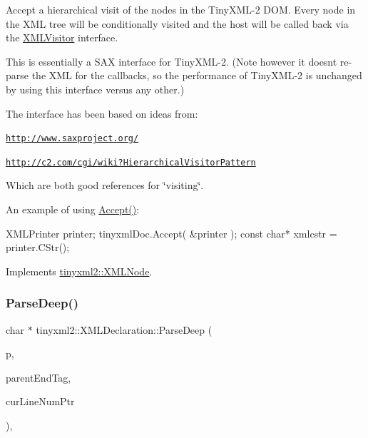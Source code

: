 Accept a hierarchical visit of the nodes in the Tiny\+X\+M\+L-\/2 D\+OM. Every node in the X\+ML tree will be conditionally visited and the host will be called back via the \mbox{\hyperlink{classtinyxml2_1_1_x_m_l_visitor}{X\+M\+L\+Visitor}} interface.

This is essentially a S\+AX interface for Tiny\+X\+M\+L-\/2. (Note however it doesn\textquotesingle{}t re-\/parse the X\+ML for the callbacks, so the performance of Tiny\+X\+M\+L-\/2 is unchanged by using this interface versus any other.)

The interface has been based on ideas from\+:


\begin{DoxyItemize}
\item \href{http://www.saxproject.org/}{\tt http\+://www.\+saxproject.\+org/}
\item \href{http://c2.com/cgi/wiki?HierarchicalVisitorPattern}{\tt http\+://c2.\+com/cgi/wiki?\+Hierarchical\+Visitor\+Pattern}
\end{DoxyItemize}

Which are both good references for \char`\"{}visiting\char`\"{}.

An example of using \mbox{\hyperlink{classtinyxml2_1_1_x_m_l_declaration_acf47629d9fc08ed6f1c164a97bcf794b}{Accept()}}\+: \begin{DoxyVerb}XMLPrinter printer;
tinyxmlDoc.Accept( &printer );
const char* xmlcstr = printer.CStr();
\end{DoxyVerb}
 

Implements \mbox{\hyperlink{classtinyxml2_1_1_x_m_l_node_a81e66df0a44c67a7af17f3b77a152785}{tinyxml2\+::\+X\+M\+L\+Node}}.

\mbox{\label{classtinyxml2_1_1_x_m_l_declaration_a42a2a36f4d78dc745063b79c16538b9b}} 
\subsubsection{\texorpdfstring{Parse\+Deep()}{ParseDeep()}}
{\footnotesize\ttfamily char $\ast$ tinyxml2\+::\+X\+M\+L\+Declaration\+::\+Parse\+Deep (\begin{DoxyParamCaption}\item[{char $\ast$}]{p,  }\item[{\mbox{\hyperlink{classtinyxml2_1_1_str_pair}{Str\+Pair}} $\ast$}]{parent\+End\+Tag,  }\item[{int $\ast$}]{cur\+Line\+Num\+Ptr }\end{DoxyParamCaption})\hspace{0.3cm}{\ttfamily [protected]}, {\ttfamily [virtual]}}



